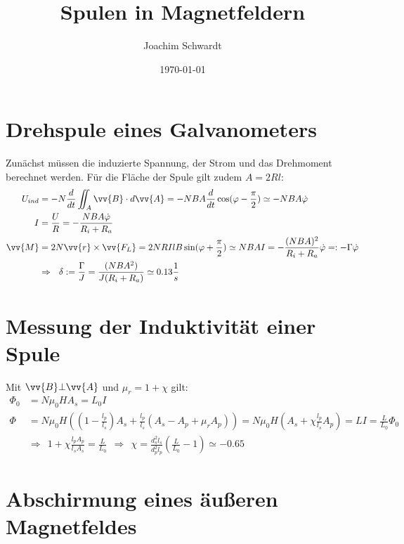 \documentclass[a4paper,12pt]{article}
\begin{document}
\title{Spulen in Magnetfeldern}
\author{Joachim Schwardt}
\date{\today}
\maketitle

\section{Drehspule eines Galvanometers}
Zunächst müssen die induzierte Spannung, der Strom und das Drehmoment berechnet werden. Für die Fläche der Spule gilt zudem $A=2Rl$:
\begin{align*}
U_{ind}&=-N\frac{d}{dt}\iint_A \vv{B}\cdot d\vv{A}=-NBA\frac{d}{dt}\cos(\varphi - \frac{\pi}{2})\simeq -NBA\dot{\varphi} \\
I&=\frac{U}{R}=-\frac{NBA\dot{\varphi}}{R_i+R_a}\\
\vv{M}&=2N\vv{r}\times\vv{F_L}=2NRIlB\sin(\varphi +\frac{\pi}{2})\simeq NBAI=-\frac{(NBA)^2}{R_i+R_a}\dot{\varphi}=:-\Gamma\dot{\varphi}\\
&\Rightarrow\ \ \delta := \frac{\Gamma}{J}=\frac{(NBA^2)}{J(R_i+R_a)}\simeq 0.13\frac{1}{s}
\end{align*}

\section{Messung der Induktivität einer Spule}
Mit $\vv{B}\bot\vv{A}$ und $\mu_r = 1+\chi$ gilt:
\begin{align*}
\Phi_0&=N\mu_0HA_s=L_0I\\
\Phi&=N\mu_0H\left((1-\frac{l_p}{l_s})A_s+\frac{l_p}{l_s}(A_s-A_p+\mu_r A_p)\right)=N\mu_0H(A_s+\chi\frac{l_p}{l_s}A_p) = LI=\frac{L}{L_0}\Phi_0\\
&\Rightarrow\ \ 1+\chi\frac{l_pA_p}{l_sA_s}=\frac{L}{L_0}\ \ \Rightarrow\ \ \chi=\frac{d_s^2l_s}{d_p^2l_p}(\frac{L}{L_0}-1)\simeq -0.65
\end{align*}
\section{Abschirmung eines äußeren Magnetfeldes}
\end{document}
